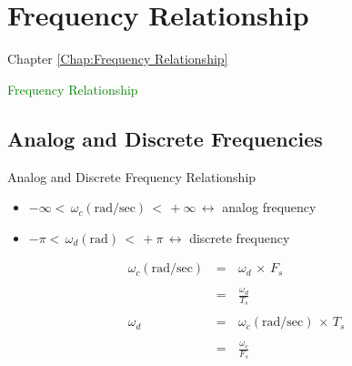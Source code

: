 \section{Frequency Relationship}
\label{Chap:Frequency Relationship}
\begin{frame}[t]{Chapter \autoref{Chap:Frequency Relationship}}
\tableofcontents[sections = \value{section}]
\end{frame}

\begin{frame}[c]

\begin{center}
\Huge \textcolor{green}{Frequency Relationship}
\end{center}

\end{frame}

\subsection{Analog and Discrete Frequencies}
\begin{frame}[t,allowframebreaks]{Analog and Discrete Frequency Relationship}

\begin{itemize}

\item $ -\infty < \, \omega_c \left(\text{rad/sec}\right) \, < \, + \infty \, \leftrightarrow$ analog frequency

\item $ - \pi < \, \omega_d \left(\text{rad}\right) \, < \, + \pi \, \leftrightarrow$ discrete frequency

\end{itemize}

\begin{equation}
\begin{array}{rcl}
\omega_c \left(\text{rad/sec}\right) \, &=& \, \omega_d \, \times \, F_s \\ \\
&=& \, \displaystyle\frac{\omega_d}{T_s}  \\ \\

\omega_d \, &=& \, \omega_c \left(\text{rad/sec}\right) \, \times \, T_s \\ \\
&=& \, \displaystyle\frac{\omega_c}{F_s}
\end{array}
\label{Eq:Freq_relation:analog_discrete_freq}
\end{equation}



\end{frame}


